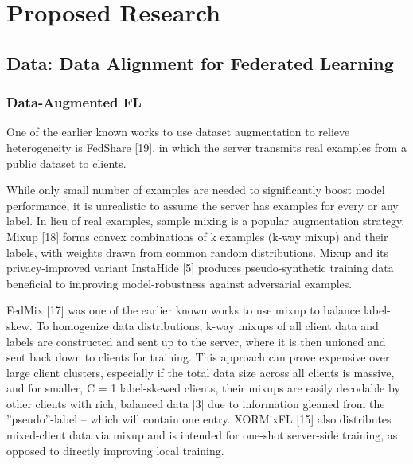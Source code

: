 \documentclass[withindex,glossary]{cam-thesis}
\begin{document}
\chapter{Proposed Research} \label{Proposal}

\section{Data: Data Alignment for Federated Learning}


\subsection{Data-Augmented FL}

One of the earlier known works to use dataset augmentation to relieve heterogeneity is FedShare [19], in which the server transmits real examples from a public dataset to clients. 

While only small number of examples are needed to significantly boost model performance, it is unrealistic to assume the server has examples for every or any label. In lieu of real examples, sample mixing is a popular augmentation strategy. Mixup [18] forms convex combinations of k examples (k-way mixup) and their labels, with weights drawn from common random distributions. Mixup and its privacy-improved variant InstaHide [5] produces pseudo-synthetic training data beneficial to improving model-robustness against adversarial examples.

FedMix [17] was one of the earlier known works to use mixup to balance label-skew. To homogenize data distributions, k-way mixups of all client data and labels are constructed and sent up to the server, where it is then unioned and sent back down to clients for training. This approach can prove expensive over large client clusters, especially if the total data size across all clients is massive, and for smaller, C = 1 label-skewed clients, their mixups are easily decodable by other clients with rich, balanced data [3] due to information gleaned from the ”pseudo”-label – which will contain one entry. XORMixFL [15] also distributes mixed-client data via mixup and is intended for one-shot server-side training, as opposed to directly improving local training.
\end{document}
